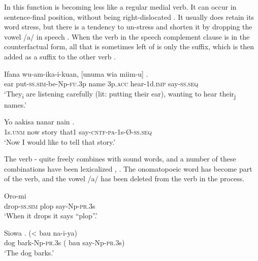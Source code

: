 In this function  is becoming less like a regular medial verb. It can occur in sentence-final position, without being right-dislocated . It usually does retain its word stress, but there is a tendency to un-stress and shorten it by dropping the vowel /a/ in speech . When the verb in the speech complement clause is in the counterfactual form, all that is sometimes left of  is only the suffix, which is then added as a suffix to the other verb .

\ea%
\label{ex:3:x1830}
\gll Ifana wu-am-ika-i-kuan, [unuma wia miim-u] \textstyleEmphasizedVernacularWords{-}.\\
ear put-\textsc{ss}.\textsc{sim}-be-Np-\textsc{fu}.3p name 3p.\textsc{acc} hear-1d.\textsc{imp} say-\textsc{ss}.\textsc{seq}\\
\glt`They\textsubscript{i} are listening carefully (lit: putting their ear), wanting to hear their\textsubscript{j} names.'
\z

\ea%
\label{ex:3:x1609}
\gll Yo aakisa nanar nain . \\
1s.\textsc{unm} now story that1 say-\textsc{cntf}-\textsc{pa}-1s-{\O}-\textsc{ss}.\textsc{seq}\\
\glt`Now I would like to tell that story.'
\z

The verb - quite freely combines with sound words, and a number of these combinations have been lexicalized , . The onomatopoeic word has become part of the verb, and the vowel /a/ has been deleted from the verb in the process.

\ea%
\label{ex:3:x330}
\gll Oro-mi   \\
drop-\textsc{ss}.\textsc{sim} plop say-Np-\textsc{pr}.3s \\
\glt`When it drops it says ``plop''.'
\z

\ea%
\label{ex:3:x331}
\gll Siowa . ({{\textless}} bau na-i-ya) \\
dog bark-Np-\textsc{pr}.3s ( bau say-Np-\textsc{pr}.3s)\\
\glt`The dog barks.'
\z

